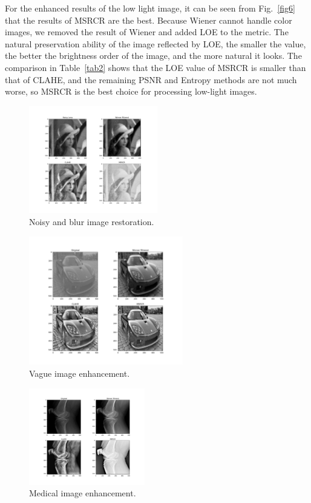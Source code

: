 \documentclass[conference]{IEEEtran}
\begin{document}
For the enhanced results of the low light image, it can be seen from Fig.~\ref{fig6} that the results of MSRCR are the best. Because Wiener cannot handle color images, we removed the result of Wiener and added LOE to the metric. The natural preservation ability of the image reflected by LOE, the smaller the value, the better the brightness order of the image, and the more natural it looks. The comparison in Table~\ref{tab2} shows that the LOE value of MSRCR is smaller than that of CLAHE, and the remaining PSNR and Entropy methods are not much worse, so MSRCR is the best choice for processing low-light images.

\begin{figure}[htbp]
\centerline{\includegraphics[width = 0.5\textwidth, height = 0.4\textwidth]{figure/lena.png}}
\caption{Noisy and blur image restoration.}
\label{fig3}
\end{figure}

\begin{figure}[htbp]
\centerline{\includegraphics[width = 0.6\textwidth, height = 0.4\textwidth]{figure/car.png}}
\caption{Vague image enhancement.}
\label{fig4}
\end{figure}

\begin{figure}[htbp]
\centerline{\includegraphics[width = 0.45\textwidth, height = 0.5\textwidth]{figure/medical.png}}
\caption{Medical image enhancement.}
\label{fig5}
\end{figure}
\end{document}

